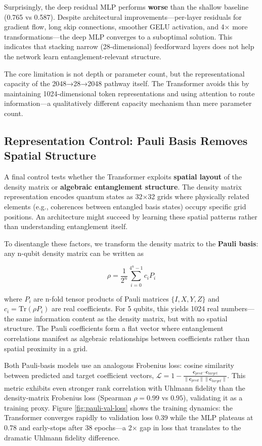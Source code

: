 \documentclass[11pt]{article}
\begin{document}
Surprisingly, the deep residual MLP performs \textbf{worse} than the shallow baseline (0.765 vs 0.587). Despite architectural improvements—per-layer residuals for gradient flow, long skip connections, smoother GELU activation, and 4× more transformations—the deep MLP converges to a suboptimal solution. This indicates that stacking narrow (28-dimensional) feedforward layers does not help the network learn entanglement-relevant structure.

The core limitation is not depth or parameter count, but the representational capacity of the 2048→28→2048 pathway itself. The Transformer avoids this by maintaining 1024-dimensional token representations and using attention to route information—a qualitatively different capacity mechanism than mere parameter count.
\subsection{Representation Control: Pauli Basis Removes Spatial Structure}
\label{sec:org821d637}

A final control tests whether the Transformer exploits \textbf{spatial layout} of the density matrix or \textbf{algebraic entanglement structure}. The density matrix representation encodes quantum states as 32×32 grids where physically related elements (e.g., coherences between entangled basis states) occupy specific grid positions. An architecture might succeed by learning these spatial patterns rather than understanding entanglement itself.

To disentangle these factors, we transform the density matrix to the \textbf{Pauli basis}: any n-qubit density matrix can be written as

$$\rho = \frac{1}{2^n} \sum_{i=0}^{4^n-1} c_i P_i$$

where \(P_i\) are n-fold tensor products of Pauli matrices \(\{I, X, Y, Z\}\) and \(c_i = \text{Tr}(\rho P_i)\) are real coefficients. For 5 qubits, this yields 1024 real numbers—the same information content as the density matrix, but with no spatial structure. The Pauli coefficients form a flat vector where entanglement correlations manifest as algebraic relationships between coefficients rather than spatial proximity in a grid.

Both Pauli-basis models use an analogous Frobenius loss: cosine similarity between predicted and target coefficient vectors, \(\mathcal{L} = 1 - \frac{\mathbf{c}_{pred} \cdot \mathbf{c}_{target}}{\|\mathbf{c}_{pred}\| \|\mathbf{c}_{target}\|}\). This metric exhibits even stronger rank correlation with Uhlmann fidelity than the density-matrix Frobenius loss (Spearman \(\rho = 0.99\) vs \(0.95\)), validating it as a training proxy. Figure \ref{fig:pauli-val-loss} shows the training dynamics: the Transformer converges rapidly to validation loss 0.39 while the MLP plateaus at 0.78 and early-stops after 38 epochs—a 2× gap in loss that translates to the dramatic Uhlmann fidelity difference.
\end{document}
